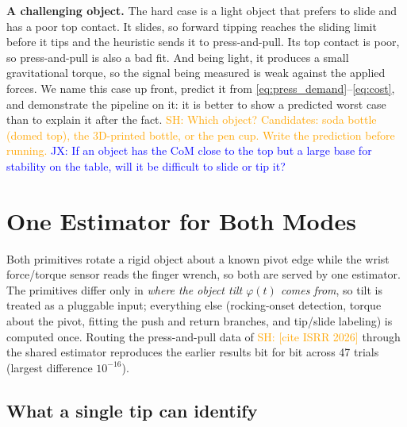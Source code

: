 \documentclass[10pt, conference]{IEEEtran}
\newcommand{\jx}[1]{\textcolor{blue}{JX: #1}}
\newcommand{\sh}[1]{\textcolor{orange}{SH: #1}}
\newcommand{\isrr}{\sh{[cite ISRR 2026]}}
\begin{document}
\noindent \textbf{A challenging object.} The hard case is a light object that prefers to slide and has a poor top contact. It slides, so forward tipping reaches the sliding limit before it tips and the heuristic sends it to press-and-pull. Its top contact is poor, so press-and-pull is also a bad fit. And being light, it produces a small gravitational torque, so the signal being measured is weak against the applied forces. We name this case up front, predict it from \eqref{eq:press_demand}--\eqref{eq:cost}, and demonstrate the pipeline on it: it is better to show a predicted worst case than to explain it after the fact. \sh{Which object? Candidates: soda bottle (domed top), the 3D-printed bottle, or the pen cup. Write the prediction before running.} \jx{If an object has the CoM close to the top but a large base for stability on the table, will it be difficult to slide or tip it?}

\section{One Estimator for Both Modes} \label{sec:estimation}

Both primitives rotate a rigid object about a known pivot edge while the wrist force/torque sensor reads the finger wrench, so both are served by one estimator. The primitives differ only in \emph{where the object tilt $\varphi(t)$ comes from}, so tilt is treated as a pluggable input; everything else (rocking-onset detection, torque about the pivot, fitting the push and return branches, and tip/slide labeling) is computed once. Routing the press-and-pull data of \isrr{} through the shared estimator reproduces the earlier results bit for bit across 47 trials (largest difference $10^{-16}$).

\subsection{What a single tip can identify} \label{sec:identifiability}
\end{document}
